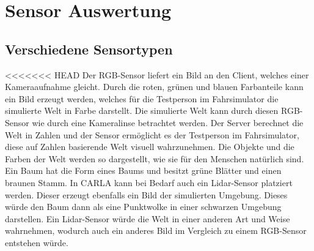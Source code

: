 \section{Sensor Auswertung}

\subsection{Verschiedene Sensortypen}
<<<<<<< HEAD
Der {\ac{RGB}}-Sensor liefert ein Bild an den Client, welches einer Kameraaufnahme gleicht. Durch die roten, grünen und blauen Farbanteile kann ein Bild erzeugt werden, welches für die Testperson im Fahrsimulator die simulierte Welt in Farbe darstellt. Die simulierte Welt kann durch diesen {\ac{RGB}}-Sensor wie durch eine Kameralinse betrachtet werden. Der Server berechnet die Welt in Zahlen und der Sensor ermöglicht es der Testperson im Fahrsimulator, diese auf Zahlen basierende Welt visuell wahrzunehmen. Die Objekte und die Farben der Welt werden so dargestellt, wie sie für den Menschen natürlich sind. Ein Baum hat die Form eines Baums und besitzt grüne Blätter und einen braunen Stamm. In CARLA kann bei Bedarf auch ein \Gls{Lidar}-Sensor platziert werden. Dieser erzeugt ebenfalls ein Bild der simulierten Umgebung. Dieses würde den Baum dann als eine Punktwolke in einer schwarzen Umgebung darstellen. Ein Lidar-Sensor würde die Welt in einer anderen Art und Weise wahrnehmen, wodurch auch ein anderes Bild im Vergleich zu einem {\ac{RGB}}-Sensor entstehen würde. 

